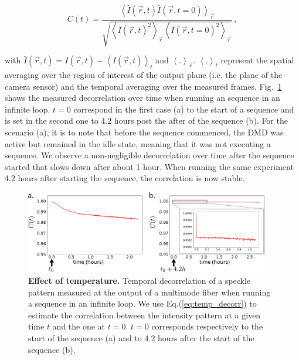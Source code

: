 \documentclass[12pt]{iopart}
\begin{document}
\begin{equation}
  C(t) =
  \frac{
    \left\langle
    \bar{I}(\vec{r}, t) \bar{I}(\vec{r}, t=0)
    \right\rangle_{\vec{r}}
  }{
    \sqrt{
      \left\langle
      \bar{I}(\vec{r}, t)^2
      \right\rangle_{\vec{r}}
      \left\langle
      \bar{I}(\vec{r}, t=0)^2
      \right\rangle_{\vec{r}}
    }
  } \, ,
  \label{eq:temp_decorr}
\end{equation}




with $\bar{I}(\vec{r}, t) = I(\vec{r}, t) - \left\langle I(\vec{r}, t) \right\rangle_{t}$
and $\left\langle . \right\rangle_{\vec{r}}$.
$\left\langle . \right\rangle_{t}$
represent the spatial averaging over the region of interest
of the output plane (i.e. the plane of the camera sensor)
and the temporal averaging over the measured frames.
Fig.~\ref{fig:temp_decorr} shows the measured decorrelation
over time when running an sequence in an infinite loop.
$t=0$ correspond in the first case (a)
to the start of a sequence
and is set in the second one to
4.2 hours post the after of the sequence (b).
For the scenario (a), it is to note that before the sequence commenced,
the DMD was active but remained in the idle state,
meaning that it was not executing a sequence.
We observe a non-negligible decorrelation over time
after the sequence started
that slows down after about 1 hour.
When running the same experiment 4.2 hours after starting the sequence,
the correlation is now stable.\\



\begin{figure}[ht]
  \centering
  \includegraphics[width = 0.95\textwidth]{images/DMD_decorrelation_T.pdf}
  \caption{
    \textbf{Effect of temperature.}
    Temporal decorrelation of a speckle pattern measured at the output of a multimode fiber
    when running a sequence in an infinite loop.
    We use Eq.(\ref{eq:temp_decorr}) to estimate the correlation between the intensity pattern
    at a given time $t$ and the one at $t=0$.
    $t=0$ corresponds respectively to the start of the sequence (a)
    and to 4.2 hours after the start of the sequence (b).
  }
  \label{fig:temp_decorr}
\end{figure}
\end{document}
